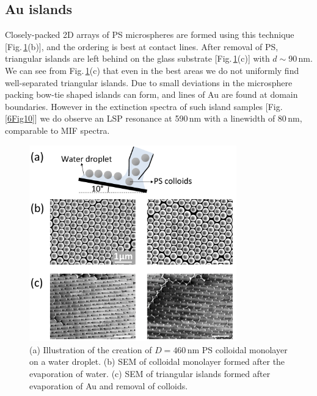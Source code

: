 \subsection{Au islands}
Closely-packed 2D arrays of PS microspheres are formed using this technique [Fig.\,\ref{6Fig9}(b)], and the ordering is best at contact lines. After removal of PS, triangular islands are left behind on the glass substrate [Fig.\,\ref{6Fig9}(c)] with $d\sim$90\,nm. We can see from Fig.\,\ref{6Fig9}(c) that even in the best areas we do not uniformly find well-separated triangular islands. Due to small deviations in the microsphere packing bow-tie shaped islands can form, and lines of Au are found at domain boundaries. However in the extinction spectra of such island samples [Fig.\,\ref{6Fig10}] we do observe an LSP resonance at 590\,nm with a linewidth of 80\,nm, comparable to MIF spectra.
\begin{figure}[h!] 
\centering    
\includegraphics[width=0.8\textwidth]{Fig9}
\caption{(a) Illustration of the creation of $D=460$\,nm PS colloidal monolayer on a water droplet. (b) SEM of colloidal monolayer formed after the evaporation of water. (c) SEM of triangular islands formed after evaporation of Au and removal of colloids.}
\label{6Fig9}
\end{figure}

